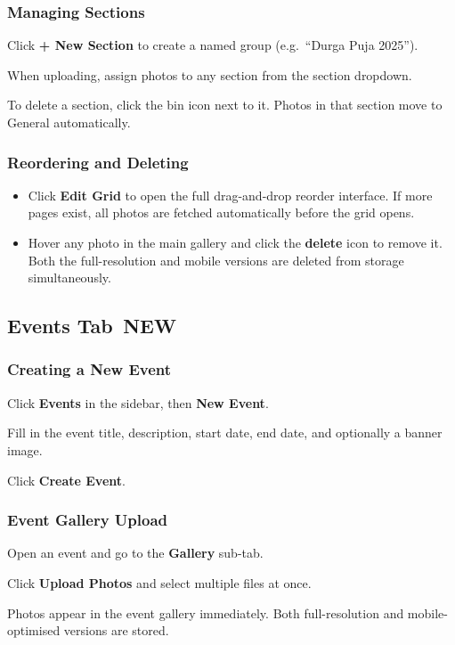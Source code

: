 \documentclass[12pt,a4paper]{article}
\newcommand{\newbadge}{%
  \colorbox{NewFrame}{\color{white}\,\textbf{\footnotesize NEW}\,}%
}
\begin{document}
\subsubsection{Managing Sections}
\begin{steps}
\item Click \textbf{+ New Section} to create a named group (e.g.\ ``Durga Puja 2025'').
\item When uploading, assign photos to any section from the section dropdown.
\item To delete a section, click the bin icon next to it. Photos in that section move to General automatically.
\end{steps}

\subsubsection{Reordering and Deleting}
\begin{itemize}
  \item Click \textbf{Edit Grid} to open the full drag-and-drop reorder interface. If more pages exist, all photos are fetched automatically before the grid opens.
  \item Hover any photo in the main gallery and click the \textbf{delete} icon to remove it. Both the full-resolution and mobile versions are deleted from storage simultaneously.
\end{itemize}

\subsection{Events Tab \newbadge}

\subsubsection{Creating a New Event}
\begin{steps}
\item Click \textbf{Events} in the sidebar, then \textbf{New Event}.
\item Fill in the event title, description, start date, end date, and optionally a banner image.
\item Click \textbf{Create Event}.
\end{steps}

\subsubsection{Event Gallery Upload}
\begin{steps}
\item Open an event and go to the \textbf{Gallery} sub-tab.
\item Click \textbf{Upload Photos} and select multiple files at once.
\item Photos appear in the event gallery immediately. Both full-resolution and mobile-optimised versions are stored.
\end{steps}
\end{document}
